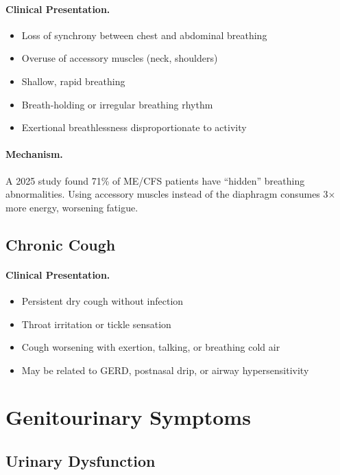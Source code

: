 \paragraph{Clinical Presentation.}
\begin{itemize}
    \item Loss of synchrony between chest and abdominal breathing
    \item Overuse of accessory muscles (neck, shoulders)
    \item Shallow, rapid breathing
    \item Breath-holding or irregular breathing rhythm
    \item Exertional breathlessness disproportionate to activity
\end{itemize}

\paragraph{Mechanism.}
A 2025 study found 71\% of ME/CFS patients have ``hidden'' breathing abnormalities. Using accessory muscles instead of the diaphragm consumes 3$\times$ more energy, worsening fatigue.

\subsection{Chronic Cough}
\label{subsec:chronic-cough}

\paragraph{Clinical Presentation.}
\begin{itemize}
    \item Persistent dry cough without infection
    \item Throat irritation or tickle sensation
    \item Cough worsening with exertion, talking, or breathing cold air
    \item May be related to GERD, postnasal drip, or airway hypersensitivity
\end{itemize}

\section{Genitourinary Symptoms}
\label{sec:genitourinary}

\subsection{Urinary Dysfunction}
\label{subsec:urinary}

